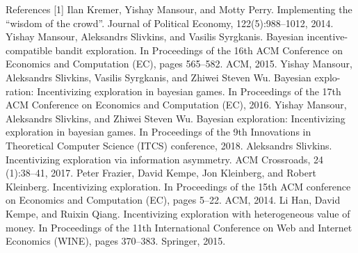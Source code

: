 \documentclass[final]{beamer} %
\begin{document}
\begin{frame}[t]
\begin{columns}[t]
\begin{column}{0.28\paperwidth}
\begin{block}{References}
[1] Ilan Kremer, Yishay Mansour, and Motty Perry. Implementing the “wisdom of the crowd”. Journal of Political Economy, 122(5):988–1012, 2014. \newline
[2] Yishay Mansour, Aleksandrs Slivkins, and Vasilis Syrgkanis. Bayesian incentive-compatible bandit exploration. In Proceedings of the 16th ACM Conference on Economics and Computation (EC), pages 565–582. ACM, 2015. \newline
[3] Yishay Mansour, Aleksandrs Slivkins, Vasilis Syrgkanis, and Zhiwei Steven Wu. Bayesian explo- ration: Incentivizing exploration in bayesian games. In Proceedings of the 17th ACM Conference on Economics and Computation (EC), 2016. \newline
[4] Yishay Mansour, Aleksandrs Slivkins, and Zhiwei Steven Wu. Bayesian exploration: Incentivizing exploration in bayesian games. In Proceedings of the 9th Innovations in Theoretical Computer Science (ITCS) conference, 2018. \newline
[5] Aleksandrs Slivkins. Incentivizing exploration via information asymmetry. ACM Crossroads, 24 (1):38–41, 2017. \newline
[6] Peter Frazier, David Kempe, Jon Kleinberg, and Robert Kleinberg. Incentivizing exploration. In Proceedings of the 15th ACM conference on Economics and Computation (EC), pages 5–22. ACM, 2014. \newline
[7] Li Han, David Kempe, and Ruixin Qiang. Incentivizing exploration with heterogeneous value of money. In Proceedings of the 11th International Conference on Web and Internet Economics (WINE), pages 370–383. Springer, 2015.
\end{block}
\end{column}
\end{columns}
\end{frame}
\end{document}
